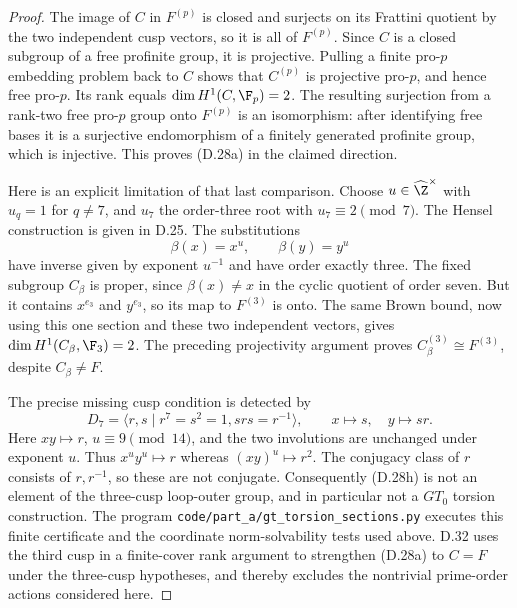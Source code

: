 \begin{proof}
The image of $C$ in $F^{(p)}$ is closed and surjects
on its Frattini quotient by the two independent cusp
vectors, so it is all of $F^{(p)}$. Since $C$ is a
closed subgroup of a free profinite group, it is
projective. Pulling a finite pro-$p$ embedding problem
back to $C$ shows that $C^{(p)}$ is projective pro-$p$,
and hence free pro-$p$. Its rank equals
$\dim H^1(C,\F_p)=2$. The resulting surjection from
a rank-two free pro-$p$ group onto $F^{(p)}$ is an
isomorphism: after identifying free bases it is a
surjective endomorphism of a finitely generated profinite
group, which is injective. This proves (D.28a) in the
claimed direction.

Here is an explicit limitation of that last comparison.
Choose $u\in\widehat\Z^\times$ with $u_q=1$ for
$q\ne7$, and $u_7$ the order-three root with
$u_7\equiv2\pmod7$. The Hensel construction is given
in D.25. The substitutions
\[
                    \beta(x)=x^u,\qquad\beta(y)=y^u
                                                               \tag{D.28h}
\]
have inverse given by exponent $u^{-1}$ and have order
exactly three. The fixed subgroup $C_\beta$ is proper,
since $\beta(x)\ne x$ in the cyclic quotient of order
seven. But it contains $x^{e_3}$ and $y^{e_3}$, so its
map to $F^{(3)}$ is onto. The same Brown bound, now
using this one section and these two independent vectors,
gives $\dim H^1(C_\beta,\F_3)=2$. The preceding
projectivity argument proves
$C_\beta^{(3)}\cong F^{(3)}$, despite $C_\beta\ne F$.

The precise missing cusp condition is detected by
\[
 D_7=\langle r,s\mid r^7=s^2=1, srs=r^{-1}\rangle,
                  \qquad x\mapsto s,\quad y\mapsto sr.
\]
Here $xy\mapsto r$, $u\equiv9\pmod{14}$, and the
two involutions are unchanged under exponent $u$.
Thus $x^u y^u\mapsto r$ whereas $(xy)^u\mapsto r^2$.
The conjugacy class of $r$ consists of $r,r^{-1}$,
so these are not conjugate. Consequently (D.28h) is
not an element of the three-cusp loop-outer group, and
in particular not a $GT_0$ torsion construction. The
program \texttt{code/part\_a/gt\_torsion\_sections.py}
executes this finite certificate and the coordinate
norm-solvability tests used above. D.32 uses the third cusp
in a finite-cover rank argument to strengthen (D.28a) to
$C=F$ under the three-cusp hypotheses, and thereby excludes
the nontrivial prime-order actions considered here.
\end{proof}
